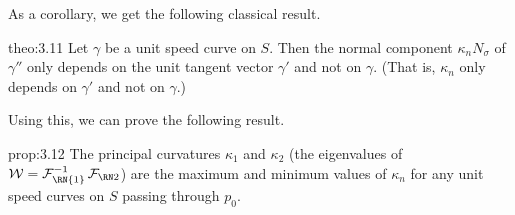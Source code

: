 As a corollary, we get the following classical result. 

\begin{theo}[Meusnier]{theo:3.11}
    Let $\gamma$ be a unit speed curve on $S$. Then the normal component 
    $\kappa_n N_\sigma$ of $\gamma''$ only depends on the unit tangent 
    vector $\gamma'$ and not on $\gamma$. (That is, $\kappa_n$ 
    only depends on $\gamma'$ and not on $\gamma$.)
\end{theo}\vspace{-0.25cm}

Using this, we can prove the following result. 

\begin{prop}{prop:3.12}
    The principal curvatures $\kappa_1$ and $\kappa_2$ (the eigenvalues of 
    ${\cal W} = {\cal F}_{\text{\RN{1}}}^{-1} \SFF$)
    are the maximum and minimum values of $\kappa_n$ for any unit speed curves 
    on $S$ passing through $p_0$. 
\end{prop}\vspace{-0.25cm} 
